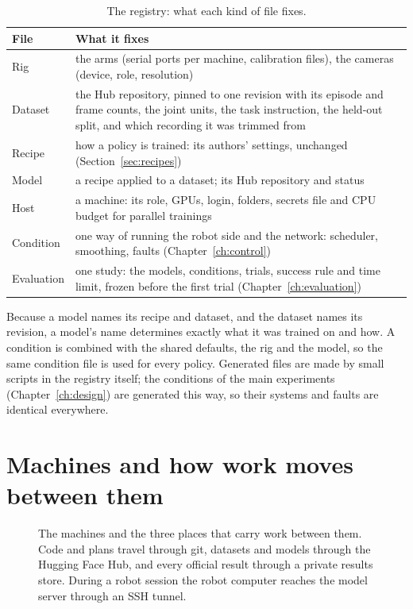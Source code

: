 \begin{table}[htbp]
  \centering
  \small
  \begin{tabularx}{\textwidth}{l X}
    \toprule
    File & What it fixes \\
    \midrule
    Rig & the arms (serial ports per machine, calibration files), the cameras (device, role, resolution) \\
    Dataset & the Hub repository, pinned to one revision with its episode and frame counts, the joint units, the task
              instruction, the held-out split, and which recording it was trimmed from \\
    Recipe & how a policy is trained: its authors' settings, unchanged (Section~\ref{sec:recipes}) \\
    Model & a recipe applied to a dataset; its Hub repository and status \\
    Host & a machine: its role, GPUs, login, folders, secrets file and CPU budget for parallel trainings \\
    Condition & one way of running the robot side and the network: scheduler, smoothing, faults
                (Chapter~\ref{ch:control}) \\
    Evaluation & one study: the models, conditions, trials, success rule and time limit, frozen before the first
                 trial (Chapter~\ref{ch:evaluation}) \\
    \bottomrule
  \end{tabularx}
  \caption{The registry: what each kind of file fixes.}\label{tab:registry}
\end{table}

Because a model names its recipe and dataset, and the dataset names its revision, a model's name determines exactly
what it was trained on and how. A condition is combined with the shared defaults, the rig and the model, so the same condition
file is used for every policy. Generated files are made by small scripts in the registry itself; the conditions of the
main experiments (Chapter~\ref{ch:design}) are generated this way, so their systems and faults are identical
everywhere.

\section{Machines and how work moves between them}\label{sec:machines}

\begin{figure}[htbp]
  \centering
  
  \caption{The machines and the three places that carry work between them. Code and plans travel through git,
           datasets and models through the Hugging Face Hub, and every official result through a private results
           store. During a robot session the robot computer reaches the model server through an SSH tunnel.}
  \label{fig:machines}
\end{figure}


